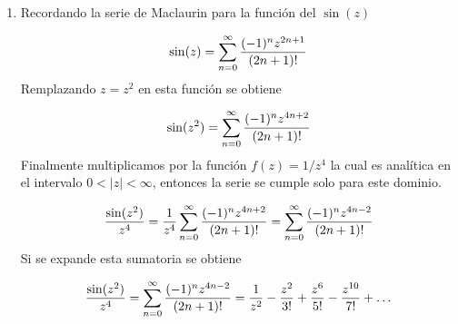 \begin{enumerate}
    \item Recordando la serie de Maclaurin para la función del $\sin(z)$
    
    \begin{gather*}
        \sin(z) = \sum_{n = 0}^{\infty} \frac{(-1)^n z^{2n+1}}{(2n+1)!}
    \end{gather*}
    Remplazando $z = z^2$ en esta función se obtiene 

    \begin{gather*}
        \sin(z^2) = \sum_{n = 0}^{\infty} \frac{(-1)^n z^{4n+2}}{(2n+1)!}
    \end{gather*}
    Finalmente multiplicamos por la función $f(z) = 1/z^4$ la cual es analítica en el intervalo $0< |z| < \infty$, entonces la serie se cumple solo para este dominio. 

    \begin{gather*}
        \frac{\sin(z^2)}{z^4} = \frac{1}{z^4}\sum_{n = 0}^{\infty} \frac{(-1)^n z^{4n+2}}{(2n+1)!} = \sum_{n = 0}^{\infty} \frac{(-1)^n z^{4n-2}}{(2n+1)!} 
    \end{gather*}
    Si se expande esta sumatoria se obtiene 

    \begin{mdframed}
        \vspace{-0.4cm}
        \begin{gather}
            \frac{\sin(z^2)}{z^4} = \sum_{n = 0}^{\infty} \frac{(-1)^n z^{4n-2}}{(2n+1)!} = \frac{1}{z^2} - \frac{z^2}{3!} + \frac{z^6}{5!} - \frac{z^{10}}{7!} + \dots
        \end{gather}
    \end{mdframed}
\end{enumerate}